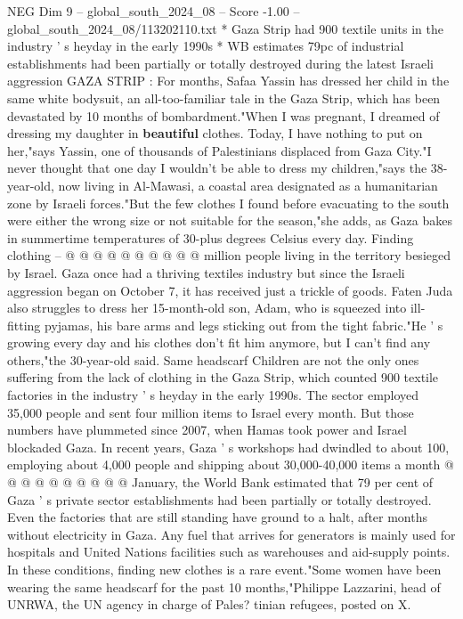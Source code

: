 \begin{textsample}{NEG Dim 9 – global\_south\_2024\_08 – Score -1.00 – global\_south\_2024\_08/113202110.txt}  \label{ex:f9_neg_343}
* Gaza Strip had 900 textile units in the industry ' s heyday in the early 1990s * WB estimates 79pc of industrial establishments had been partially or totally destroyed during the latest Israeli aggression GAZA STRIP : For months, Safaa Yassin has dressed her child in the same white bodysuit, an all-too-familiar tale in the Gaza Strip, which has been devastated by 10 months of bombardment."When I was pregnant, I dreamed of dressing my daughter in \textbf{beautiful} clothes.
Today, I have nothing to put on her,"says Yassin, one of thousands of Palestinians displaced from Gaza City."I never thought that one day I wouldn't be able to dress my children,"says the 38-year-old, now living in Al-Mawasi, a coastal area designated as a humanitarian zone by Israeli forces."But the few clothes I found before evacuating to the south were either the wrong size or not suitable for the season,"she adds, as Gaza bakes in summertime temperatures of 30-plus degrees Celsius every day.
Finding clothing -- @ @ @ @ @ @ @ @ @ @ million people living in the territory besieged by Israel.
Gaza once had a thriving textiles industry but since the Israeli aggression began on October 7, it has received just a trickle of goods.
Faten Juda also struggles to dress her 15-month-old son, Adam, who is squeezed into ill-fitting pyjamas, his bare arms and legs sticking out from the tight fabric."He ' s growing every day and his clothes don't fit him anymore, but I can't find any others,"the 30-year-old said.
Same headscarf Children are not the only ones suffering from the lack of clothing in the Gaza Strip, which counted 900 textile factories in the industry ' s heyday in the early 1990s.
The sector employed 35,000 people and sent four million items to Israel every month.
But those numbers have plummeted since 2007, when Hamas took power and Israel blockaded Gaza.
In recent years, Gaza ' s workshops had dwindled to about 100, employing about 4,000 people and shipping about 30,000-40,000 items a month @ @ @ @ @ @ @ @ @ @ January, the World Bank estimated that 79 per cent of Gaza ' s private sector establishments had been partially or totally destroyed.
Even the factories that are still standing have ground to a halt, after months without electricity in Gaza.
Any fuel that arrives for generators is mainly used for hospitals and United Nations facilities such as warehouses and aid-supply points.
In these conditions, finding new clothes is a rare event."Some women have been wearing the same headscarf for the past 10 months,"Philippe Lazzarini, head of UNRWA, the UN agency in charge of Pales? tinian refugees, posted on X.

\end{textsample}
